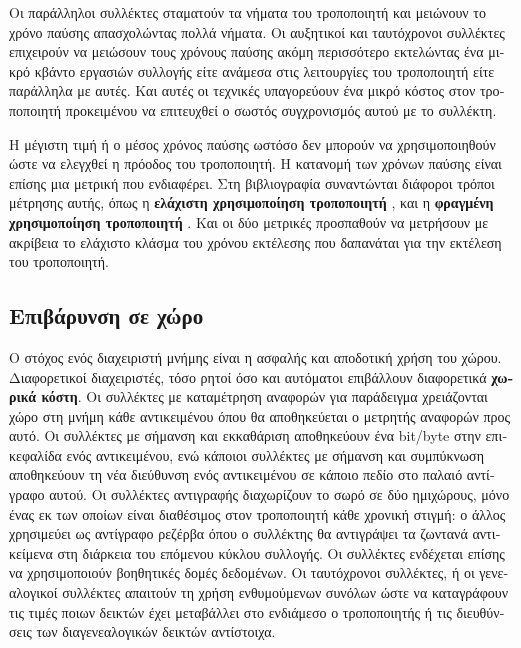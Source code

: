\begin{greek}
Οι παράλληλοι συλλέκτες σταματούν τα νήματα του τροποποιητή και
μειώνουν το χρόνο παύσης απασχολώντας πολλά νήματα. Οι αυξητικοί
και ταυτόχρονοι συλλέκτες επιχειρούν να μειώσουν τους χρόνους
παύσης ακόμη περισσότερο εκτελώντας ένα μικρό κβάντο εργασιών
συλλογής είτε ανάμεσα στις λειτουργίες του τροποποιητή είτε
παράλληλα με αυτές. Και αυτές οι τεχνικές υπαγορεύουν ένα μικρό
κόστος στον τροποποιητή προκειμένου να επιτευχθεί ο σωστός συγχρονισμός 
αυτού με το συλλέκτη.

Η μέγιστη τιμή ή ο μέσος χρόνος παύσης ωστόσο δεν μπορούν να
χρησιμοποιηθούν ώστε να ελεγχθεί η πρόοδος του τροποποιητή. Η
κατανομή των χρόνων παύσης είναι επίσης μια μετρική που ενδιαφέρει.
Στη βιβλιογραφία συναντώνται διάφοροι τρόποι μέτρησης αυτής,
όπως η \textbf{ελάχιστη χρησιμοποίηση τροποποιητή} \cite{DBLP:conf/pldi/ChengB01},
και η \textbf{φραγμένη χρησιμοποίηση τροποποιητή} \cite{DBLP:conf/oopsla/SachindranMB04}.
Και οι δύο μετρικές προσπαθούν να μετρήσουν με ακρίβεια το
ελάχιστο κλάσμα του χρόνου εκτέλεσης που δαπανάται για την
εκτέλεση του τροποποιητή.

\subsection{Επιβάρυνση σε χώρο}
Ο στόχος ενός διαχειριστή μνήμης είναι η ασφαλής και αποδοτική
χρήση του χώρου. Διαφορετικοί διαχειριστές, τόσο ρητοί όσο και
αυτόματοι επιβάλλουν διαφορετικά \textbf{χωρικά κόστη}. Οι συλλέκτες
με καταμέτρηση αναφορών για παράδειγμα χρειάζονται χώρο στη
μνήμη κάθε αντικειμένου όπου θα αποθηκεύεται ο μετρητής αναφορών
προς αυτό. Οι συλλέκτες με σήμανση και εκκαθάριση αποθηκεύουν
ένα bit/byte στην επικεφαλίδα ενός αντικειμένου, ενώ κάποιοι
συλλέκτες με σήμανση και συμπύκνωση αποθηκεύουν τη νέα διεύθυνση
ενός αντικειμένου σε κάποιο πεδίο στο παλαιό αντίγραφο αυτού.
Οι συλλέκτες αντιγραφής διαχωρίζουν το σωρό σε δύο ημιχώρους,
μόνο ένας εκ των οποίων είναι διαθέσιμος στον τροποποιητή κάθε
χρονική στιγμή: ο άλλος χρησιμεύει ως αντίγραφο ρεζέρβα όπου
ο συλλέκτης θα αντιγράψει τα ζωντανά αντικείμενα στη διάρκεια
του επόμενου κύκλου συλλογής. Οι συλλέκτες ενδέχεται επίσης να
χρησιμοποιούν βοηθητικές δομές δεδομένων. Οι ταυτόχρονοι συλλέκτες,
ή οι γενεαλογικοί συλλέκτες απαιτούν τη χρήση ενθυμούμενων συνόλων
ώστε να καταγράφουν τις τιμές ποιων δεικτών έχει μεταβάλλει στο
ενδιάμεσο ο τροποποιητής ή τις διευθύνσεις των διαγενεαλογικών
δεικτών αντίστοιχα.


\end{greek}
